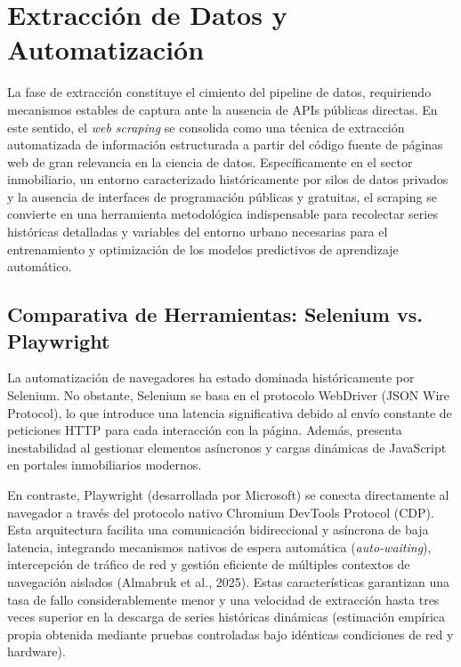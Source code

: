 \documentclass[a4paper,11pt,openany]{book}
\begin{document}
\section{Extracción de Datos y Automatización}
La fase de extracción constituye el cimiento del pipeline de datos, requiriendo mecanismos estables de captura ante la ausencia de APIs públicas directas. En este sentido, el \textit{web scraping} se consolida como una técnica de extracción automatizada de información estructurada a partir del código fuente de páginas web de gran relevancia en la ciencia de datos. Específicamente en el sector inmobiliario, un entorno caracterizado históricamente por silos de datos privados y la ausencia de interfaces de programación públicas y gratuitas, el scraping se convierte en una herramienta metodológica indispensable para recolectar series históricas detalladas y variables del entorno urbano necesarias para el entrenamiento y optimización de los modelos predictivos de aprendizaje automático.

\subsection{Comparativa de Herramientas: Selenium vs. Playwright}
La automatización de navegadores ha estado dominada históricamente por Selenium. No obstante, Selenium se basa en el protocolo WebDriver (JSON Wire Protocol), lo que introduce una latencia significativa debido al envío constante de peticiones HTTP para cada interacción con la página. Además, presenta inestabilidad al gestionar elementos asíncronos y cargas dinámicas de JavaScript en portales inmobiliarios modernos.

En contraste, Playwright (desarrollada por Microsoft) se conecta directamente al navegador a través del protocolo nativo Chromium DevTools Protocol (CDP). Esta arquitectura facilita una comunicación bidireccional y asíncrona de baja latencia, integrando mecanismos nativos de espera automática (\textit{auto-waiting}), intercepción de tráfico de red y gestión eficiente de múltiples contextos de navegación aislados (Almabruk et al., 2025). Estas características garantizan una tasa de fallo considerablemente menor y una velocidad de extracción hasta tres veces superior en la descarga de series históricas dinámicas (estimación empírica propia obtenida mediante pruebas controladas bajo idénticas condiciones de red y hardware).
\end{document}
